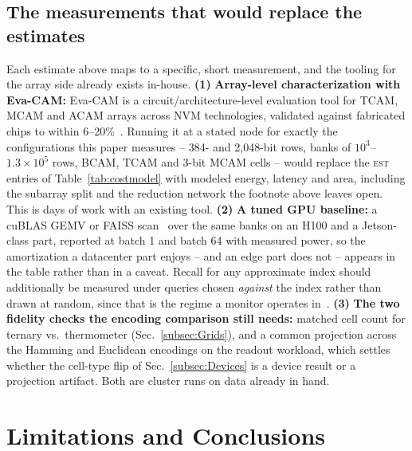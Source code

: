 \documentclass[conference]{IEEEtran}
\newcommand{\tcam}{{TCAM}\xspace}
\newcommand{\mcam}{{MCAM}\xspace}
\begin{document}
\subsection{The measurements that would replace the estimates}
\label{subsec:NextMeasurements}
Each estimate above maps to a specific, short measurement, and the
tooling for the array side already exists in-house.
{\bf (1)} \textbf{Array-level characterization with Eva-CAM:} Eva-CAM
is a circuit/architecture-level evaluation tool for TCAM, MCAM and
ACAM arrays across NVM technologies, validated against fabricated
chips to within 6--20\%~\cite{liu2022evacam}. Running it at a stated
node for exactly the configurations this paper measures -- 384- and
2{,}048-bit rows, banks of $10^{3}$--$1.3\!\times\!10^{5}$ rows, BCAM,
\tcam and 3-bit \mcam cells -- would replace the \textsc{est} entries
of Table~\ref{tab:costmodel} with modeled energy, latency and area,
including the subarray split and the reduction network the footnote
above leaves open. This is days of work with an existing tool.
{\bf (2)} \textbf{A tuned GPU baseline:} a cuBLAS GEMV or FAISS
scan~\cite{faisscuvs2025} over the same banks on an H100 and a
Jetson-class part, reported at batch 1 and batch 64 with measured
power, so the amortization a datacenter part enjoys -- and an edge
part does not -- appears in the table rather than in a caveat. Recall
for any approximate index should additionally be measured under
queries chosen \emph{against} the index rather than drawn at random,
since that is the regime a monitor operates
in~\cite{andoni2026robustann}.
{\bf (3)} \textbf{The two fidelity checks the encoding comparison
still needs:} matched cell count for ternary vs.\ thermometer
(Sec.~\ref{subsec:Grids}), and a common projection across the Hamming
and Euclidean encodings on the readout workload, which settles whether
the cell-type flip of Sec.~\ref{subsec:Devices} is a device result or
a projection artifact. Both are cluster runs on data already in hand.

\section{Limitations and Conclusions}
\label{sec:Conclusions}
\end{document}
